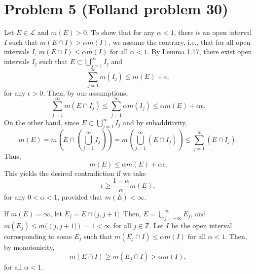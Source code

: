 \documentclass{article}
\begin{document}
\section{Problem 5 (Folland problem 30)}
Let $E\in\mathcal L$ and $m(E)>0$. To show that for any $\alpha<1$, there is an open interval $I$ such that $m(E\cap I)>\alpha m(I)$, we assume the contrary, i.e., that for all open intervals $I$, $m(E\cap I)\leq\alpha m(I)$ for all $\alpha<1$. By Lemma 1.17, there exist open intervals $I_j$ such that $E\subset\bigcup_{j=1}^\infty I_j$ and 
\[
\sum_{j=1}^\infty m(I_j)\leq m(E)+\epsilon,
\]
for any $\epsilon>0$. Then, by our assumptions,
\[
\sum_{j=1}^\infty m(E\cap I_j)\leq\sum_{j=1}^\infty \alpha m(I_j)\leq \alpha m(E)+\alpha\epsilon.
\]
On the other hand, since $E\subset\bigcup_{j=1}^\infty I_j$ and by subadditivity,
\[
m(E)=m\left(E\cap\left(\bigcup_{j=1}^\infty I_j\right)\right)=m\left(\bigcup_{j=1}^\infty (E\cap I_j)\right)\leq\sum_{j=1}^\infty(E\cap I_j).
\]
Thus, 
\[
m(E)\leq \alpha m(E)+\alpha\epsilon.
\]
This yields the desired contradiction if we take 
\[
\epsilon\geq\frac{1-\alpha}{\alpha}m(E),
\]
for any $0<\alpha<1$, provided that $m(E)<\infty$. 

If $m(E)=\infty$, let $E_j=E\cap(j,j+1]$. Then, $E=\bigcup_{j=-\infty}^\infty E_j$, and $m(E_j)\leq m((j,j+1])=1<\infty$ for all $j\in\mathbb{Z}$. Let $I$ be the open interval corresponding to some $E_j$ such that $m(E_j\cap I)\leq\alpha m(I)$ for all $\alpha<1$. Then, by monotonicity,
\[
m(E\cap I)\geq m(E_j\cap I)>\alpha m(I),
\]
for all $\alpha<1$.
\end{document}
